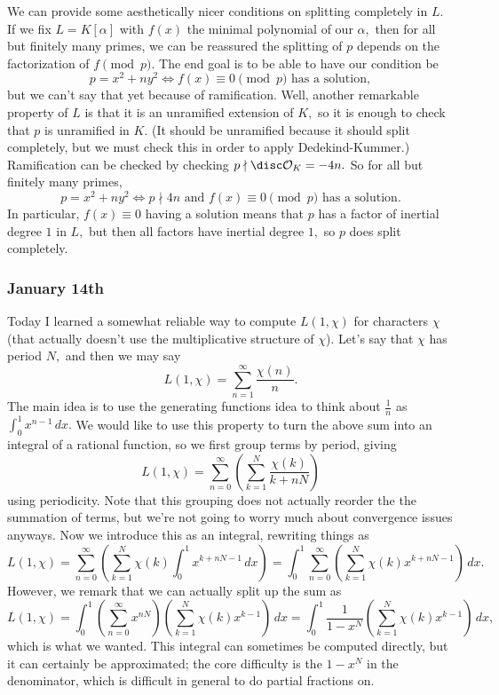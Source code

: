 We can provide some aesthetically nicer conditions on splitting completely in $L.$ If we fix $L=K[\alpha]$ with $f(x)$ the minimal polynomial of our $\alpha,$ then for all but finitely many primes, we can be reassured the splitting of $p$ depends on the factorization of $f\pmod p.$ The end goal is to be able to have our condition be
\[p=x^2+ny^2\iff f(x)\equiv0\pmod p\text{ has a solution},\]
but we can't say that yet because of ramification. Well, another remarkable property of $L$ is that it is an unramified extension of $K,$ so it is enough to check that $p$ is unramified in $K.$ (It should be unramified because it should split completely, but we must check this in order to apply Dedekind-Kummer.) Ramification can be checked by checking $p\nmid\disc\mathcal O_K=-4n.$ So for all but finitely many primes,
\[p=x^2+ny^2\iff p\nmid4n\text{ and }f(x)\equiv0\pmod p\text{ has a solution}.\]
In particular, $f(x)\equiv0$ having a solution means that $p$ has a factor of inertial degree $1$ in $L,$ but then all factors have inertial degree $1,$ so $p$ does split completely.

\subsubsection{January 14th}
Today I learned a somewhat reliable way to compute $L(1,\chi)$ for characters $\chi$ (that actually doesn't use the multiplicative structure of $\chi$). Let's say that $\chi$ has period $N,$ and then we may say
\[L(1,\chi)=\sum_{n=1}^\infty\frac{\chi(n)}n.\]
The main idea is to use the generating functions idea to think about $\frac1n$ as $\int_0^1x^{n-1}\,dx.$ We would like to use this property to turn the above sum into an integral of a rational function, so we first group terms by period, giving
\[L(1,\chi)=\sum_{n=0}^\infty\left(\sum_{k=1}^N\frac{\chi(k)}{k+nN}\right)\]
using periodicity. Note that this grouping does not actually reorder the the summation of terms, but we're not going to worry much about convergence issues anyways. Now we introduce this as an integral, rewriting things as
\[L(1,\chi)=\sum_{n=0}^\infty\left(\sum_{k=1}^N\chi(k)\int_0^1x^{k+nN-1}\,dx\right)=\int_0^1\sum_{n=0}^\infty\left(\sum_{k=1}^N\chi(k)x^{k+nN-1}\right)\,dx.\]
However, we remark that we can actually split up the sum as
\[L(1,\chi)=\int_0^1\left(\sum_{n=0}^\infty x^{nN}\right)\left(\sum_{k=1}^N\chi(k)x^{k-1}\right)\,dx=\boxed{\int_0^1\frac1{1-x^N}\left(\sum_{k=1}^N\chi(k)x^{k-1}\right)\,dx},\]
which is what we wanted. This integral can sometimes be computed directly, but it can certainly be approximated; the core difficulty is the $1-x^N$ in the denominator, which is difficult in general to do partial fractions on.

